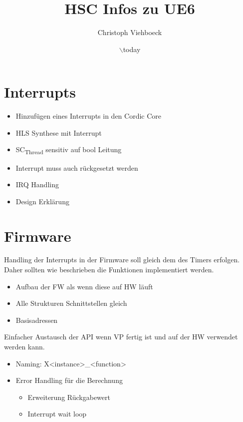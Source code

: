 \documentclass[11pt]{article}
\author{Christoph Viehboeck}
\date{$\backslash$today}
\title{HSC Infos zu UE6}
\begin{document}
\maketitle

\section{Interrupts}
\label{sec:orgb091a5f}

\begin{itemize}
\item Hinzufügen eines Interrupts in den Cordic Core
\item HLS Synthese mit Interrupt
\item SC\textsubscript{Thread} sensitiv auf bool Leitung
\item Interrupt muss auch rückgesetzt werden
\item IRQ Handling
\item Design Erklärung
\end{itemize}

\section{Firmware}
\label{sec:org16c54db}

Handling der Interrupts in der Firmware soll gleich dem des Timers
erfolgen. Daher sollten wie beschrieben die Funktionen implementiert
werden.

\begin{itemize}
\item Aufbau der FW als wenn diese auf HW läuft
\item Alle Strukturen Schnittstellen gleich
\item Basisadressen
\end{itemize}

Einfacher Austausch der API wenn VP fertig ist und auf der HW
verwendet werden kann.

\begin{itemize}
\item Naming: X<instance>\_<function>
\item Error Handling für die Berechnung 
\begin{itemize}
\item Erweiterung Rückgabewert
\item Interrupt wait loop
\end{itemize}
\end{itemize}
\end{document}
